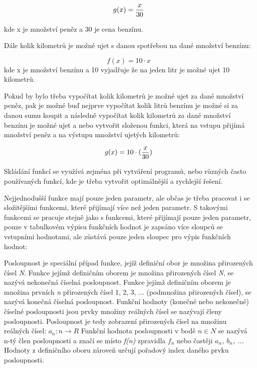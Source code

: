 $$ g(x) = {x \over 30} $$

kde x je množství peněz a 30 je cena benzínu.

Dále kolik kilometrů je možné ujet s danou spotřebou na dané množství benzínu:

$$ f(x) = {10 \cdot x} $$
kde x je množství benzínu a 10 vyjadřuje že na jeden litr je možné ujet 10 kilometrů.

Pokud by bylo třeba vypočítat kolik kilometrů je možné ujet za dané množství peněz, pak je možné buď nejprve vypočítat kolik litrů benzínu je možné si za danou sumu koupit a následně vypočítat kolik kilometrů za dané množství benzínu je možné ujet a nebo vytvořit složenou funkci, která na vstupu přijímá množství peněz a na výstupu množství ujetých kilometrů:

$$ g(x) = {10 \cdot ({x \over 30})}$$

Skládání funkcí se využívá zejména při vytváření programů, nebo různých často používaných funkcí, kde je třeba vytvořit optimálnější a rychlejší řešení.


Nejjednodušší funkce mají pouze jeden parametr, ale občas je třeba pracovat i se složitějšími funkcemi, které přijímají více než jeden parametr. S takovými funkcemi se pracuje stejně jako s funkcemi, které přijímají pouze jeden parametr, pouze v tabulkovém výpisu funkčních hodnot je zapsáno více sloupců se vstupními hodnotami, ale zůstává pouze jeden sloupec pro výpis funkčních hodnot:




Posloupnost je speciální případ funkce, jejíž definiční obor je množina přirozených čísel {\it N}.  Funkce jejímž definičním oborem je množina přirozených čísel {\it N}, se nazývá nekonečná číselná posloupnost. Funkce jejímž definičním oborem je množina prvních {\it n} přirozených čísel {1, 2, 3, ...} (podmnožina přirozených čísel), se nazývá konečná číselná posloupnost. Funkční hodnoty (konečné nebo nekonečné) číselné posloupnosti jsou prvky množiny reálných čísel se nazývají členy posloupnosti. Posloupnost je tedy zobrazení přirozených čísel na množinu reálných čísel: $a_n: n \rightarrow R $ Funkční hodnota posloupnosti v bodě $n \in N $ se nazývá n-tý člen posloupnosti a značí se místo {\it f(n)} zpravidla {\it $f_n$} nebo častěji  {\it $a_n$, $b_n$, ... } Hodnoty z definičního oboru zároveň určují pořadový index daného prvku posloupnosti. 

